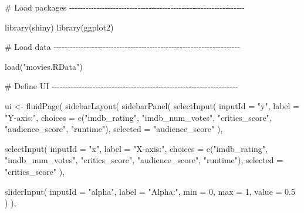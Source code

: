 \documentclass[
  letterpaper,
  DIV=11,
  numbers=noendperiod]{scrreprt}
\newenvironment{Shaded}{\begin{snugshade}}{\end{snugshade}}
\newcommand{\AttributeTok}[1]{\textcolor[rgb]{0.40,0.46,0.14}{#1}}
\newcommand{\CommentTok}[1]{\textcolor[rgb]{0.37,0.37,0.37}{#1}}
\newcommand{\DecValTok}[1]{\textcolor[rgb]{0.68,0.00,0.00}{#1}}
\newcommand{\FloatTok}[1]{\textcolor[rgb]{0.68,0.00,0.00}{#1}}
\newcommand{\FunctionTok}[1]{\textcolor[rgb]{0.28,0.35,0.67}{#1}}
\newcommand{\NormalTok}[1]{\textcolor[rgb]{0.00,0.46,0.62}{#1}}
\newcommand{\OtherTok}[1]{\textcolor[rgb]{0.00,0.46,0.62}{#1}}
\newcommand{\StringTok}[1]{\textcolor[rgb]{0.13,0.47,0.30}{#1}}
\begin{document}
\begin{Shaded}
\begin{Highlighting}[]
\CommentTok{\# Load packages {-}{-}{-}{-}{-}{-}{-}{-}{-}{-}{-}{-}{-}{-}{-}{-}{-}{-}{-}{-}{-}{-}{-}{-}{-}{-}{-}{-}{-}{-}{-}{-}{-}{-}{-}{-}{-}{-}{-}{-}{-}{-}{-}{-}{-}{-}{-}{-}{-}{-}{-}{-}{-}{-}{-}{-}{-}{-}{-}{-}{-}{-}{-}{-}}

\FunctionTok{library}\NormalTok{(shiny)}
\FunctionTok{library}\NormalTok{(ggplot2)}

\CommentTok{\# Load data {-}{-}{-}{-}{-}{-}{-}{-}{-}{-}{-}{-}{-}{-}{-}{-}{-}{-}{-}{-}{-}{-}{-}{-}{-}{-}{-}{-}{-}{-}{-}{-}{-}{-}{-}{-}{-}{-}{-}{-}{-}{-}{-}{-}{-}{-}{-}{-}{-}{-}{-}{-}{-}{-}{-}{-}{-}{-}{-}{-}{-}{-}{-}{-}{-}{-}{-}{-}}

\FunctionTok{load}\NormalTok{(}\StringTok{"movies.RData"}\NormalTok{)}

\CommentTok{\# Define UI {-}{-}{-}{-}{-}{-}{-}{-}{-}{-}{-}{-}{-}{-}{-}{-}{-}{-}{-}{-}{-}{-}{-}{-}{-}{-}{-}{-}{-}{-}{-}{-}{-}{-}{-}{-}{-}{-}{-}{-}{-}{-}{-}{-}{-}{-}{-}{-}{-}{-}{-}{-}{-}{-}{-}{-}{-}{-}{-}{-}{-}{-}{-}{-}{-}{-}{-}{-}}

\NormalTok{ui }\OtherTok{\textless{}{-}} \FunctionTok{fluidPage}\NormalTok{(}
  \FunctionTok{sidebarLayout}\NormalTok{(}
    \FunctionTok{sidebarPanel}\NormalTok{(}
      \FunctionTok{selectInput}\NormalTok{(}
        \AttributeTok{inputId =} \StringTok{"y"}\NormalTok{,}
        \AttributeTok{label =} \StringTok{"Y{-}axis:"}\NormalTok{,}
        \AttributeTok{choices =} \FunctionTok{c}\NormalTok{(}\StringTok{"imdb\_rating"}\NormalTok{, }\StringTok{"imdb\_num\_votes"}\NormalTok{, }\StringTok{"critics\_score"}\NormalTok{, }\StringTok{"audience\_score"}\NormalTok{, }\StringTok{"runtime"}\NormalTok{),}
        \AttributeTok{selected =} \StringTok{"audience\_score"}
\NormalTok{      ),}

      \FunctionTok{selectInput}\NormalTok{(}
        \AttributeTok{inputId =} \StringTok{"x"}\NormalTok{,}
        \AttributeTok{label =} \StringTok{"X{-}axis:"}\NormalTok{,}
        \AttributeTok{choices =} \FunctionTok{c}\NormalTok{(}\StringTok{"imdb\_rating"}\NormalTok{, }\StringTok{"imdb\_num\_votes"}\NormalTok{, }\StringTok{"critics\_score"}\NormalTok{, }\StringTok{"audience\_score"}\NormalTok{, }\StringTok{"runtime"}\NormalTok{),}
        \AttributeTok{selected =} \StringTok{"critics\_score"}
\NormalTok{      ),}

      \FunctionTok{sliderInput}\NormalTok{(}
        \AttributeTok{inputId =} \StringTok{"alpha"}\NormalTok{,}
        \AttributeTok{label =} \StringTok{"Alpha:"}\NormalTok{,}
        \AttributeTok{min =} \DecValTok{0}\NormalTok{, }\AttributeTok{max =} \DecValTok{1}\NormalTok{,}
        \AttributeTok{value =} \FloatTok{0.5}
\NormalTok{      )}
\NormalTok{    ),}


\end{Highlighting}
\end{Shaded}
\end{document}
